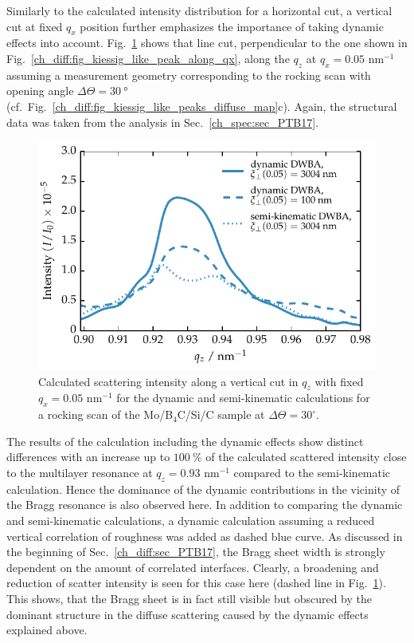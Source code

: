 Similarly to the calculated intensity distribution for a horizontal cut, a vertical cut at fixed $q_x$ position further emphasizes the importance of taking dynamic effects into account. Fig.~\ref{ch_diff:fig_comparison_full_semi} shows that line cut, perpendicular to the one shown in Fig.~\ref{ch_diff:fig_kiessig_like_peak_along_qx}, along the $q_z$ at $q_x=0.05$ nm$^{-1}$ assuming a measurement geometry corresponding to the rocking scan with opening angle $\Delta \Theta = \SI{30}{\degree}$ (cf.~Fig.~\ref{ch_diff:fig_kiessig_like_peaks_diffuse_map}c). Again, the structural data was taken from the analysis in Sec.~\ref{ch_spec:sec_PTB17}.
\begin{figure}[htbp]
        \includegraphics{img/PTB17_diffuse_qz_kinematic_vs_dynamic_100nm} \caption{Calculated scattering intensity along a vertical cut in $q_z$ with fixed $q_x=0.05$ nm$^{-1}$ for the dynamic and semi-kinematic calculations for a rocking scan of the Mo/B$_4$C/Si/C sample at $\Delta\Theta=30^\circ$.} \label{ch_diff:fig_comparison_full_semi} 
\end{figure}
The results of the calculation including the dynamic effects show distinct differences with an increase up to $\SI{100}{\percent}$ of the calculated scattered intensity close to the multilayer resonance at $q_z=0.93$ nm$^{-1}$ compared to the semi-kinematic calculation. Hence the dominance of the dynamic contributions in the vicinity of the Bragg resonance is also observed here. In addition to comparing the dynamic and semi-kinematic calculations, a dynamic calculation assuming a reduced vertical correlation of roughness was added as dashed blue curve. As discussed in the beginning of Sec.~\ref{ch_diff:sec_PTB17}, the Bragg sheet width is strongly dependent on the amount of correlated interfaces. Clearly, a broadening and reduction of scatter intensity is seen for this case here (dashed line in Fig.~\ref{ch_diff:fig_comparison_full_semi}). This shows, that the Bragg sheet is in fact still visible but obscured by the dominant structure in the diffuse scattering caused by the dynamic effects explained above.


